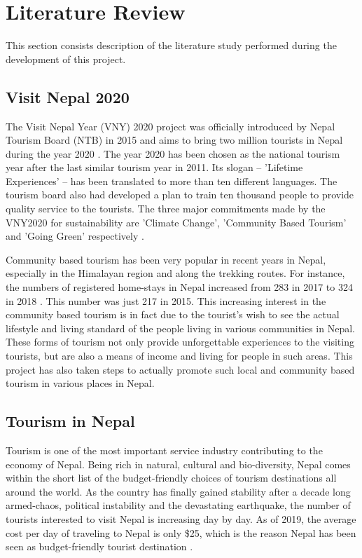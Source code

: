 \documentclass[12pt, a4paper, oneside]{article}
\begin{document}
\break
\section{Literature Review}
This section consists description of the literature study performed during the development of this project.

\subsection{Visit Nepal 2020}
The Visit Nepal Year (VNY) 2020 project was officially introduced by Nepal Tourism Board (NTB) in 2015 and aims to bring two million tourists in Nepal during the year 2020 \cite{visitnepal}. The year 2020 has been chosen as the national tourism year after the last similar tourism year in 2011. Its slogan -- 'Lifetime Experiences' --  has been translated to more than ten different languages. The tourism board also had developed a plan to train ten thousand people to provide quality service to the tourists. The three major commitments made by the VNY2020 for sustainability are 'Climate Change', 'Community Based Tourism' and 'Going Green' respectively \cite{vny}.

Community based tourism has been very popular in recent years in Nepal, especially in the Himalayan region and along the trekking routes. For instance, the numbers of registered home-stays in Nepal increased from 283 in 2017 to 324 in 2018 \cite{tourismstats}. This number was just 217 in 2015. This increasing interest in the community based tourism is in fact due to the tourist's wish to see the actual lifestyle and living standard of the people living in various communities in Nepal. These forms of tourism not only provide unforgettable experiences to the visiting tourists, but are also a means of income and living for people in such areas. This project has also taken steps to actually promote such local and community based tourism in various places in Nepal.

\subsection{Tourism in Nepal}
Tourism is one of the most important service industry contributing to the economy of Nepal. Being rich in natural, cultural and bio-diversity, Nepal comes within the short list of the budget-friendly choices of tourism destinations all around the world. As the country has finally gained stability after a decade long armed-chaos, political instability and the devastating earthquake, the number of tourists interested to visit Nepal is increasing day by day. As of 2019, the average cost per day of traveling to Nepal is only \$25, which is the reason Nepal has been seen as budget-friendly tourist destination \cite{nepaltravelcost}.
\end{document}
